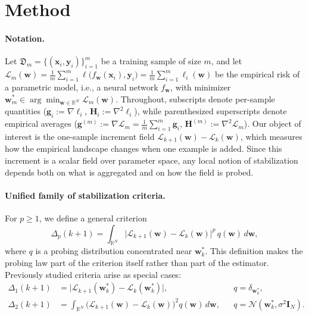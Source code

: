 \documentclass{article}
\begin{document}
\section{Method}
\label{sec:method}

\paragraph{Notation.}
Let $\mathfrak{D}_m = \{(\mathbf{x}_i, \mathbf{y}_i)\}_{i=1}^m$ be a training sample of size $m$, and let $\mathcal{L}_m(\mathbf w) = \frac{1}{m}\sum_{i=1}^m \ell\bigl(f_{\mathbf w}(\mathbf x_i), \mathbf y_i\bigr) = \frac{1}{m}\sum_{i=1}^m \ell_i(\mathbf w)$ be the empirical risk of a parametric model, i.e., a neural network $f_{\mathbf w}$, with minimizer $\mathbf w_m^* \in \arg\min_{\mathbf w\in\mathbb R^N} \mathcal L_m(\mathbf w)$. Throughout, subscripts denote per-sample quantities ($\mathbf g_i := \nabla \ell_i$, $\mathbf H_i := \nabla^2 \ell_i$), while parenthesized superscripts denote empirical averages ($\mathbf g^{(m)} := \nabla \mathcal L_m = \frac1m\sum_{i=1}^m \mathbf g_i$, $\mathbf H^{(m)} := \nabla^2 \mathcal L_m$). Our object of interest is the one-sample increment field $\mathcal L_{k+1}(\mathbf w)-\mathcal L_k(\mathbf w)$, which measures how the empirical landscape changes when one example is added. Since this increment is a scalar field over parameter space, any local notion of stabilization depends both on what is aggregated and on how the field is probed.

\paragraph{Unified family of stabilization criteria.}
For $p\ge 1$, we define a general criterion
\begin{equation}
\label{eq:general-p-criterion}
\Delta_p(k+1)
=
\int_{\mathbb R^N}
\bigl|
\mathcal L_{k+1}(\mathbf w)-\mathcal L_k(\mathbf w)
\bigr|^p
\, q(\mathbf w)\, d\mathbf w,
\end{equation}
where $q$ is a probing distribution concentrated near $\mathbf w_k^*$. This definition makes the probing law part of the criterion itself rather than part of the estimator. Previously studied criteria arise as special cases:
\begin{align}
\Delta_1(k+1)
&=
\bigl|
\mathcal L_{k+1}(\mathbf w_k^*)-\mathcal L_k(\mathbf w_k^*)
\bigr|,
&&
q=\delta_{\mathbf w_k^*},
\label{eq:delta1-special}
\\
\Delta_2(k+1)
&=
\int_{\mathbb R^N}
\bigl(
\mathcal L_{k+1}(\mathbf w)-\mathcal L_k(\mathbf w)
\bigr)^2
q(\mathbf w)\,d\mathbf w,
&&
q=\mathcal N(\mathbf w_k^*,\sigma^2\mathbf I_N).
\label{eq:delta2-special}
\end{align}
\end{document}
